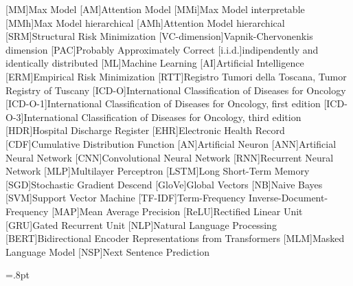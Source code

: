 [MM]{Max Model}
[AM]{Attention Model}
[MMi]{Max Model interpretable}
[MMh]{Max Model hierarchical}
[AMh]{Attention Model hierarchical}
[SRM]{Structural Risk Minimization}
[VC-dimension]{Vapnik-Chervonenkis dimension}
[PAC]{Probably Approximately Correct}
[i.i.d.]{indipendently and identically distributed}
[ML]{Machine Learning}
[AI]{Artificial Intelligence}
[ERM]{Empirical Risk Minimization}
[RTT]{Registro Tumori della Toscana, Tumor Registry of Tuscany}
[ICD-O]{International Classification of Diseases for Oncology}
[ICD-O-1]{International Classification of Diseases for Oncology, first edition}
[ICD-O-3]{International Classification of Diseases for Oncology, third edition}
[HDR]{Hospital Discharge Register}
[EHR]{Electronic Health Record}
[CDF]{Cumulative Distribution Function}
[AN]{Artificial Neuron}
[ANN]{Artificial Neural Network}
[CNN]{Convolutional Neural Network}
[RNN]{Recurrent Neural Network}
[MLP]{Multilayer Perceptron}
[LSTM]{Long Short-Term Memory}
[SGD]{Stochastic Gradient Descend}
[GloVe]{Global Vectors}
[NB]{Naive Bayes}
[SVM]{Support Vector Machine}
[TF-IDF]{Term-Frequency Inverse-Document-Frequency}
[MAP]{Mean Average Precision}
[ReLU]{Rectified Linear Unit}
[GRU]{Gated Recurrent Unit}
[NLP]{Natural Language Processing}
[BERT]{Bidirectional Encoder Representations from Transformers}
[MLM]{Masked Language Model}
[NSP]{Next Sentence Prediction}

\newcommand\floatwidth{0.9\textwidth}
\newcommand\attTableIcdoWidth{2.5cm}
\newcommand\attTableTextWidth{10cm}
\newlength\lunderset
\newlength{}
\lunderset=1.7pt\relax
{}=.8pt\relax
\def\stackalignment{l}
\newcommand\att[4][1]{\setbox0=\hbox{#2}%
  \stackunder[#1\lunderset-\rulethick]{\strut#2}{\color{#3!#4}\rule{\wd0}{\rulethick}}}

\newcommand{\attvisB}[3]{\tikz[overlay]\node[fill=att!#2,inner sep=1pt, anchor=text, rectangle, rounded corners=1mm,draw=attb!#3] {#1};\phantom{#1}}

\makeatletter
  \providecommand*\setfloatlocations[2]{\@namedef{fps@#1}{#2}}
\makeatother
\setfloatlocations{figure}{htbp}
\setfloatlocations{table}{htbp}

